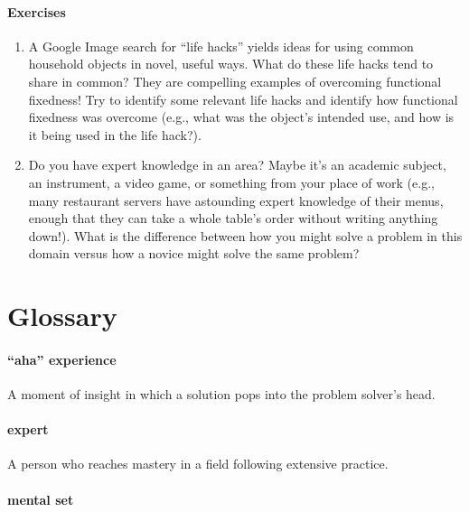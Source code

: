 \documentclass[
]{krantz}
\providecommand{\tightlist}{%
  \setlength{\itemsep}{0pt}\setlength{\parskip}{0pt}}
\begin{document}
\hypertarget{exercises-9}{%
\paragraph*{Exercises}\label{exercises-9}}

\begin{enumerate}
\def\labelenumi{\arabic{enumi}.}
\tightlist
\item
  A Google Image search for ``life hacks'' yields ideas for using common household objects in novel, useful ways. What do these life hacks tend to share in common? They are compelling examples of overcoming functional fixedness! Try to identify some relevant life hacks and identify how functional fixedness was overcome (e.g., what was the object's intended use, and how is it being used in the life hack?).
\item
  Do you have expert knowledge in an area? Maybe it's an academic subject, an instrument, a video game, or something from your place of work (e.g., many restaurant servers have astounding expert knowledge of their menus, enough that they can take a whole table's order without writing anything down!). What is the difference between how you might solve a problem in this domain versus how a novice might solve the same problem?
\end{enumerate}

\hypertarget{glossary-8}{%
\section{Glossary}\label{glossary-8}}

\hypertarget{aha-experience}{%
\paragraph*{``aha'' experience}\label{aha-experience}}

A moment of insight in which a solution pops into the problem solver's head.

\hypertarget{expert}{%
\paragraph*{expert}\label{expert}}

A person who reaches mastery in a field following extensive practice.

\hypertarget{mental-set}{%
\paragraph*{mental set}\label{mental-set}}
\end{document}
